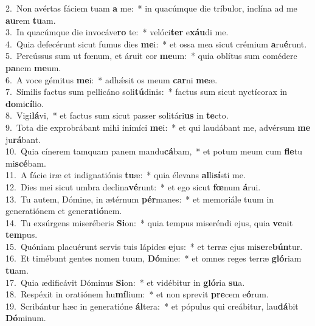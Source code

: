{2.~}Non avértas fáciem tuam \textbf{a} me:~* in quacúmque die tríbulor, inclína ad me \textbf{au}rem \textbf{tu}am.\\
{3.~}In quacúmque die invocáve\textbf{ro} te:~* velóci\textbf{ter} e\textbf{xáu}di me.\\
{4.~}Quia defecérunt sicut fumus dies \textbf{me}i:~* et ossa mea sicut crémium \textbf{a}ru\textbf{é}runt.\\
{5.~}Percússus sum ut fœnum, et áruit cor \textbf{me}um:~* quia oblítus sum comédere \textbf{pa}nem \textbf{me}um.\\
{6.~}A voce gémitus \textbf{me}i:~* adhǽsit os meum \textbf{car}ni \textbf{me}æ.\\
{7.~}Símilis factus sum pellicáno soli\textbf{tú}dinis:~* factus sum sicut nyctícorax in \textbf{do}mi\textbf{cí}lio.\\
{8.~}Vigi\textbf{lá}vi,~* et factus sum sicut passer solitári\textbf{us} in \textbf{te}cto.\\
{9.~}Tota die exprobrábant mihi inimíci \textbf{me}i:~* et qui laudábant me, advérsum \textbf{me} ju\textbf{rá}bant.\\
{10.~}Quia cínerem tamquam panem mandu\textbf{cá}bam,~* et potum meum cum \textbf{fle}tu mi\textbf{scé}bam.\\
{11.~}A fácie iræ et indignatiónis \textbf{tu}æ:~* quia élevans \textbf{al}li\textbf{sí}sti me.\\
{12.~}Dies mei sicut umbra declina\textbf{vé}runt:~* et ego sicut \textbf{fœ}num \textbf{á}rui.\\
{13.~}Tu autem, Dómine, in ætérnum \textbf{pér}manes:~* et memoriále tuum in generatiónem et gene\textbf{ra}ti\textbf{ó}nem.\\
{14.~}Tu exsúrgens miseréberis \textbf{Si}on:~* quia tempus miseréndi ejus, quia \textbf{ve}nit \textbf{tem}pus.\\
{15.~}Quóniam placuérunt servis tuis lápides \textbf{e}jus:~* et terræ ejus mi\textbf{se}re\textbf{bún}tur.\\
{16.~}Et timébunt gentes nomen tuum, \textbf{Dó}mine:~* et omnes reges terræ \textbf{gló}riam \textbf{tu}am.\\
{17.~}Quia ædificávit Dóminus \textbf{Si}on:~* et vidébitur in \textbf{gló}ria \textbf{su}a.\\
{18.~}Respéxit in oratiónem hu\textbf{mí}lium:~* et non sprevit \textbf{pre}cem e\textbf{ó}rum.\\
{19.~}Scribántur hæc in generatióne \textbf{ál}tera:~* et pópulus qui creábitur, lau\textbf{dá}bit \textbf{Dó}minum.\\
